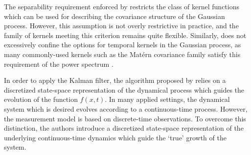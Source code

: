 \documentclass[10pt]{article}
\begin{document}
The separability requirement enforced by  restricts the class of kernel functions which can be used for describing the covariance structure of the Gaussian process. However, this assumption is not overly restrictive in practice, and the family of kernels meeting this criterion remains quite flexible. Similarly,  does not excessively confine the options for temporal kernels in the Gaussian process, as many commonly-used kernels such as the Mat{\'e}rn covariance family satisfy this requirement of the power spectrum \citep{GPML-Book-2006}.

In order to apply the Kalman filter, the algorithm proposed by \citeauthor{Todescato-Efficient-2020} relies on a discretized state-space representation of the dynamical process which guides the evolution of the function $f(x, t)$. In many applied settings, the dynamical system which is desired evolves according to a continuous-time process. However, the measurement model is based on discrete-time observations. To overcome this distinction, the authors introduce a discretized state-space representation of the underlying continuous-time dynamics which guide the `true' growth of the system. 
\end{document}
